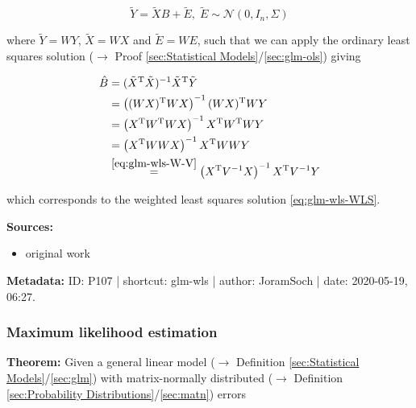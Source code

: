 \documentclass[a4paper,12pt,twoside]{book}
\begin{document}
\begin{equation} \label{eq:glm-wls-GLM-W-dev}
\tilde{Y} = \tilde{X}B + \tilde{E}, \; \tilde{E} \sim \mathcal{N}(0, I_n, \Sigma)
\end{equation}

where $\tilde{Y} = WY$, $\tilde{X} = WX$ and $\tilde{E} = WE$, such that we can apply the ordinary least squares solution ($\rightarrow$ Proof \ref{sec:Statistical Models}/\ref{sec:glm-ols}) giving

\begin{equation} \label{eq:glm-wls-WLS-qed}
\begin{split}
\hat{B} &= (\tilde{X}^\mathrm{T} \tilde{X})^{-1} \tilde{X}^\mathrm{T} \tilde{Y} \\
&= \left( (WX)^\mathrm{T} WX \right)^{-1} (WX)^\mathrm{T} WY \\
&= \left( X^\mathrm{T} W^\mathrm{T} W X \right)^{-1} X^\mathrm{T} W^\mathrm{T} W Y \\
&= \left( X^\mathrm{T} W W X \right)^{-1} X^\mathrm{T} W W Y \\
&\overset{\eqref{eq:glm-wls-W-V}}{=} \left( X^\mathrm{T} V^{-1} X \right)^{-1} X^\mathrm{T} V^{-1} Y
\end{split}
\end{equation}

which corresponds to the weighted least squares solution \eqref{eq:glm-wls-WLS}.


\vspace{1em}
\textbf{Sources:}
\begin{itemize}
\item original work\end{itemize}


\vspace{1em}
\textbf{Metadata:} ID: P107 | shortcut: glm-wls | author: JoramSoch | date: 2020-05-19, 06:27.
\vspace{1em}



\subsubsection[\textbf{Maximum likelihood estimation}]{Maximum likelihood estimation} \label{sec:glm-mle}
\setcounter{equation}{0}

\textbf{Theorem:} Given a general linear model ($\rightarrow$ Definition \ref{sec:Statistical Models}/\ref{sec:glm}) with matrix-normally distributed ($\rightarrow$ Definition \ref{sec:Probability Distributions}/\ref{sec:matn}) errors
\end{document}
